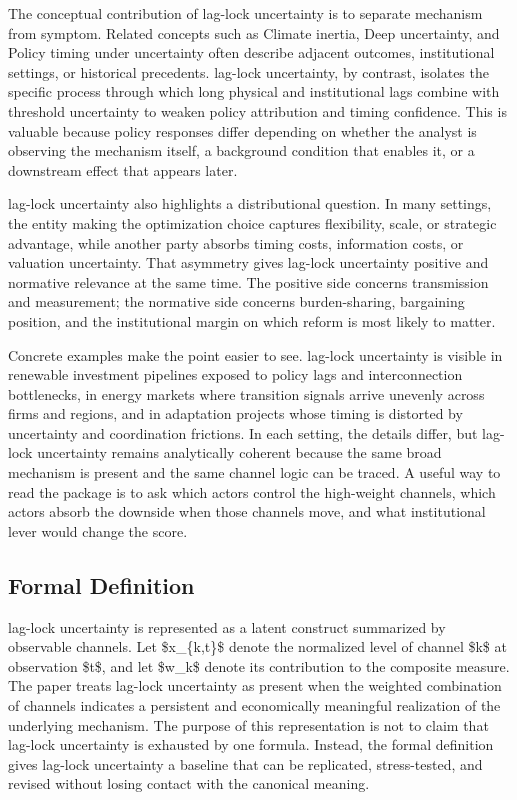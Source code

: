 \documentclass[12pt]{article}
\begin{document}
The conceptual contribution of lag-lock uncertainty is to separate mechanism from symptom. Related concepts such as Climate inertia, Deep uncertainty, and Policy timing under uncertainty often describe adjacent outcomes, institutional settings, or historical precedents. lag-lock uncertainty, by contrast, isolates the specific process through which long physical and institutional lags combine with threshold uncertainty to weaken policy attribution and timing confidence. This is valuable because policy responses differ depending on whether the analyst is observing the mechanism itself, a background condition that enables it, or a downstream effect that appears later.

lag-lock uncertainty also highlights a distributional question. In many settings, the entity making the optimization choice captures flexibility, scale, or strategic advantage, while another party absorbs timing costs, information costs, or valuation uncertainty. That asymmetry gives lag-lock uncertainty positive and normative relevance at the same time. The positive side concerns transmission and measurement; the normative side concerns burden-sharing, bargaining position, and the institutional margin on which reform is most likely to matter.

Concrete examples make the point easier to see. lag-lock uncertainty is visible in renewable investment pipelines exposed to policy lags and interconnection bottlenecks, in energy markets where transition signals arrive unevenly across firms and regions, and in adaptation projects whose timing is distorted by uncertainty and coordination frictions. In each setting, the details differ, but lag-lock uncertainty remains analytically coherent because the same broad mechanism is present and the same channel logic can be traced. A useful way to read the package is to ask which actors control the high-weight channels, which actors absorb the downside when those channels move, and what institutional lever would change the score.

\subsection{Formal Definition}
lag-lock uncertainty is represented as a latent construct summarized by observable channels. Let \$x\_\{k,t\}\$ denote the normalized level of channel \$k\$ at observation \$t\$, and let \$w\_k\$ denote its contribution to the composite measure. The paper treats lag-lock uncertainty as present when the weighted combination of channels indicates a persistent and economically meaningful realization of the underlying mechanism. The purpose of this representation is not to claim that lag-lock uncertainty is exhausted by one formula. Instead, the formal definition gives lag-lock uncertainty a baseline that can be replicated, stress-tested, and revised without losing contact with the canonical meaning.
\end{document}
